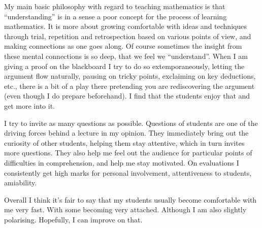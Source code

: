 \documentclass{amsart}
\begin{document}
My main basic philosophy with regard
to teaching mathematics is that ``understanding'' is in a sense
a poor concept for the process of learning mathematics. It is more about growing comfortable with ideas and techniques through trial, repetition  and retrospection based on various points of view,
and making connections as one goes along. 
Of course sometimes the insight
from these mental connections is so deep, that we feel we ``understand''. When I am giving a proof on the blackboard I try to do so extemporaneously, letting the argument flow naturally, pausing on tricky points, exclaiming on key deductions, etc., there is a bit of a play there pretending you are rediscovering the argument (even though I do prepare beforehand).
I find that the students enjoy that and get more into it. 

I try to invite as many questions as possible. Questions of
students are one of the driving forces behind a lecture in my opinion. They
immediately bring out the curiosity of other students, helping
them stay attentive, which in turn invites more questions. They also help me
feel out the audience for particular points of difficulties in comprehension, and
help me stay motivated. On evaluations I consistently get high marks for personal involvement, attentiveness to students, amiability.

%  
Overall I think it's fair to say that my students usually become comfortable
with me very fast. With some becoming very attached. Although I am also
slightly polarising. Hopefully, I can improve on that.
\end{document}
